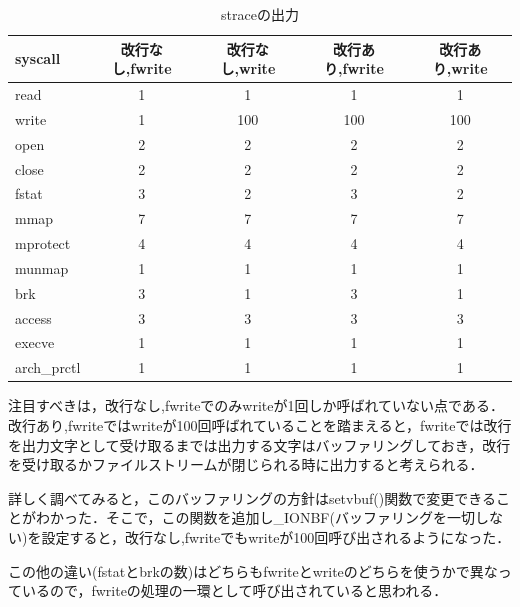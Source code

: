 \documentclass[a4j,10pt,titlepage]{jsarticle}
\begin{document}
\begin{table}[H]
  \begin{center}
  \caption{straceの出力}
  \label{table:strace}
  \begin{tabular}{l|c|c|c|c}\hline
  syscall & 改行なし,fwrite & 改行なし,write & 改行あり,fwrite & 改行あり,write \\ \hline \hline
read & 1 & 1 & 1 & 1 \\ \hline
write & 1 & 100 & 100 & 100 \\ \hline
open & 2 & 2 & 2 & 2 \\ \hline
close & 2 & 2 & 2 & 2 \\ \hline
fstat & 3 & 2 & 3 & 2 \\ \hline
mmap & 7 & 7 & 7 & 7 \\ \hline
mprotect & 4 & 4 & 4 & 4 \\ \hline
munmap & 1 & 1 & 1 & 1 \\ \hline
brk & 3 & 1 & 3 & 1 \\ \hline
access & 3 & 3 & 3 & 3 \\ \hline
execve & 1 & 1 & 1 & 1 \\ \hline
arch\_prctl & 1 & 1 & 1 & 1 \\ \hline
  \end{tabular}
  \end{center}
\end{table}

注目すべきは，改行なし,fwriteでのみwriteが1回しか呼ばれていない点である．改行あり,fwriteではwriteが100回呼ばれていることを踏まえると，fwriteでは改行を出力文字として受け取るまでは出力する文字はバッファリングしておき，改行を受け取るかファイルストリームが閉じられる時に出力すると考えられる．

詳しく調べてみると，このバッファリングの方針はsetvbuf()関数で変更できることがわかった．そこで，この関数を追加し\_IONBF(バッファリングを一切しない)を設定すると，改行なし,fwriteでもwriteが100回呼び出されるようになった．

この他の違い(fstatとbrkの数)はどちらもfwriteとwriteのどちらを使うかで異なっているので，fwriteの処理の一環として呼び出されていると思われる．
\end{document}
